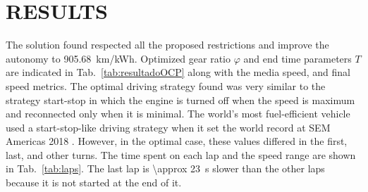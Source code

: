 \section{RESULTS}

The solution found respected all the proposed restrictions and improve the autonomy to \SI{905.68}{km/kWh}.
Optimized gear ratio $\varphi$ and end time parameters $T$ are indicated in Tab.~\ref{tab:resultadoOCP} along with the %
media speed, and final speed metrics.
The optimal driving strategy found was very similar to the strategy start-stop 
in which the engine is turned off when the speed is maximum and reconnected only when it is minimal. 
The world’s most fuel-efficient vehicle used a start-stop-like driving strategy when it set the world record at SEM Americas 2018 \citep{pp:Grady2019}. 
However, in the optimal case, these values differed in the first, last, and other turns. 
The time spent on each lap and the speed range are shown in Tab.~\ref{tab:laps}.
The last lap is \SI{\approx 23}{s} slower than the other laps because it is not started at the end of it. 


